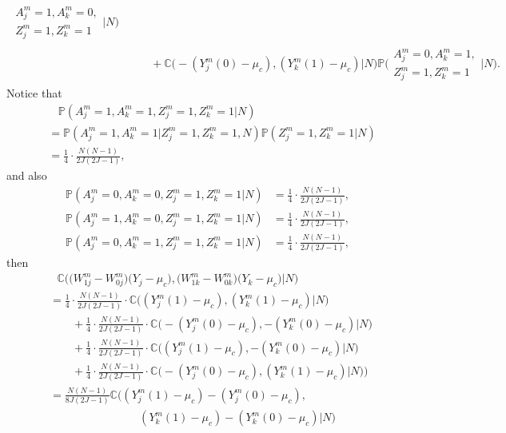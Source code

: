 \documentclass[12pt]{extarticle}
\newcommand{\pp}{\mathbb{P}}
\newcommand{\nind}{J}
\newcommand{\cV}{\mathbb{C}}
\begin{document}
{{\begin{align*}
\begin{array}{l}
                      A^m_j=1,A^m_k=0, \\
                      Z^m_j=1,Z^m_k=1\end{array}\Big|N\Big)  \\
& \qquad + \cV\Big(-(Y^m_j(0)-\mu_c),(Y^m_k(1)-\mu_c)\Big|N\Big)
              \pp\Big(\begin{array}{l}
                      A^m_j=0,A^m_k=1, \\
                      Z^m_j=1,Z^m_k=1\end{array}\Big|N\Big). 
\end{align*}}  Notice that 
{\allowdisplaybreaks \begin{align*}
& ~~~~ \pp(A^m_j=1,A^m_k=1,Z^m_j=1,Z^m_k=1|N) \\
&= \pp(A^m_j=1,A^m_k=1|Z^m_j=1,Z^m_k=1,N)\pp(Z^m_j=1,Z^m_k=1|N) \\
&= \frac{1}{4}\cdot \frac{N(N-1)}{2\nind (2\nind-1)},
\end{align*}}and also 
\begin{align*}\pp(A^m_j=0,A^m_k=0,Z^m_j=1,Z^m_k=1|N)  &= \frac{1}{4}\cdot \frac{N(N-1)}{2\nind (2\nind-1)}, \\
\pp(A^m_j=1,A^m_k=0,Z^m_j=1,Z^m_k=1|N) &= \frac{1}{4}\cdot \frac{N(N-1)}{2\nind (2\nind-1)}, \\
\pp(A^m_j=0,A^m_k=1,Z^m_j=1,Z^m_k=1|N) &= \frac{1}{4}\cdot \frac{N(N-1)}{2\nind (2\nind-1)}, 
\end{align*} then 
{\allowdisplaybreaks \begin{align*}
&~~~ \cV\Big(\big(W_{1j}^m-W_{0j}^m\big)\big(Y_j-\mu_c\big),\big(W_{1k}^m-W_{0k}^m\big)\big(Y_k-\mu_c\big)\Big|N\Big) \nonumber \\
&= \frac{1}{4}\cdot \frac{N(N-1)}{2\nind (2\nind-1)}\cdot \cV\big((Y^m_j(1)-\mu_c),(Y^m_k(1)-\mu_c)\big|N\big) ~ \\
& \qquad + \frac{1}{4}\cdot \frac{N(N-1)}{2\nind (2\nind-1)}\cdot \cV\big(-(Y^m_j(0)-\mu_c),-(Y^m_k(0)-\mu_c)\big|N\big) ~ \\
& \qquad + \frac{1}{4}\cdot \frac{N(N-1)}{2\nind (2\nind-1)}\cdot \cV\big((Y^m_j(1)-\mu_c),-(Y^m_k(0)-\mu_c)\big|N\big) ~ \\
& \qquad + \frac{1}{4}\cdot \frac{N(N-1)}{2\nind (2\nind-1)}\cdot \cV\big(-(Y^m_j(0)-\mu_c),(Y^m_k(1)-\mu_c)\big|N\big)\Big) \\
&= \frac{N(N-1)}{8\nind (2\nind-1)} \cV\Big((Y^m_j(1)-\mu_c)-(Y^m_j(0)-\mu_c), ~\nonumber \\
& \qquad \qquad \qquad \qquad (Y^m_k(1)-\mu_c)-(Y^m_k(0)-\mu_c)\Big|N\Big) \\

\end{align*}}}
\end{document}
